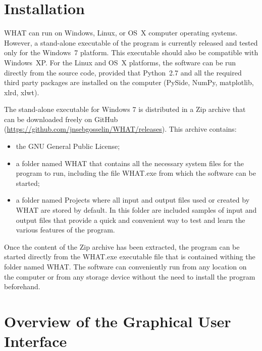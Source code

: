 \documentclass[12pt, letterpaper, fleqn]{report}
\begin{document}
\section{Installation}\label{sec:intallation}

WHAT can run on Windows, Linux, or OS X computer operating systems. However, a stand-alone executable of the program is currently released and tested only for the Windows 7 platform. This executable should also be compatible with Windows XP. For the Linux and OS X platforms, the software can be run directly from the source code, provided that Python 2.7 and all the required third party packages are installed on the computer (PySide, NumPy, matplotlib, xlrd, xlwt).

The stand-alone executable for Windows 7 is distributed in a Zip archive that can be downloaded freely on GitHub (\url{https://github.com/jnsebgosselin/WHAT/releases}). This archive contains:

\begin{itemize}
\item{the GNU General Public License;}
\item{a folder named WHAT that contains all the necessary system files for the program to run, including the file WHAT.exe from which the software can be started;}
\item{a folder named Projects where all input and output files used or created by WHAT are stored by default. In this folder are included samples of input and output files that provide a quick and convenient way to test and learn the various features of the program.}
\end{itemize}

Once the content of the Zip archive has been extracted, the program can be started directly from the WHAT.exe executable file that is contained withing the folder named WHAT. The software can conveniently run from any location on the computer or from any storage device without the need to install the program beforehand.

\section{Overview of the Graphical User Interface}
\end{document}
